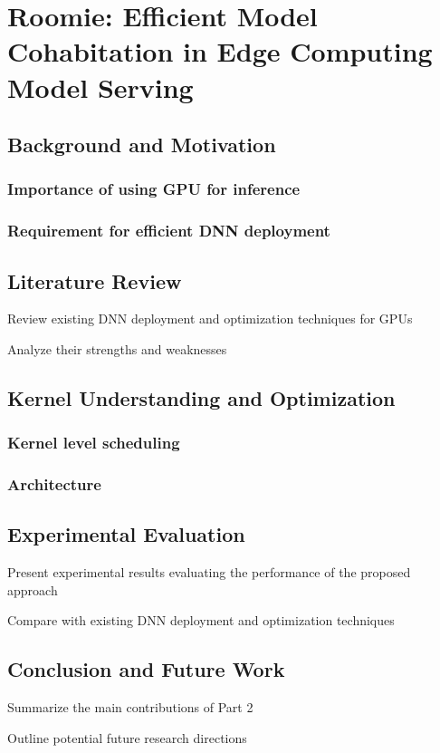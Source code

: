 \setchapterpreamble[u]{\margintoc}
\chapter{Roomie: Efficient Model Cohabitation in Edge Computing Model Serving}

\section{Background and Motivation}

\subsection{Importance of using GPU for inference}

\subsection{Requirement for efficient DNN deployment}

\section{Literature Review}

Review existing DNN deployment and optimization techniques for GPUs 

Analyze their strengths and weaknesses 

\section{Kernel Understanding and Optimization}

\subsection{Kernel level scheduling}

\subsection{Architecture}

\section{Experimental Evaluation}

Present experimental results evaluating the performance of the proposed approach 

Compare with existing DNN deployment and optimization techniques 

\section{ Conclusion and Future Work}

Summarize the main contributions of Part 2 

Outline potential future research directions 
